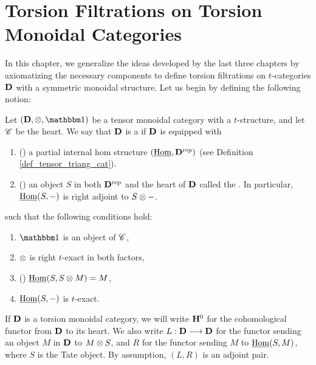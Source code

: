\newpage
\chapter{Torsion Filtrations on Torsion Monoidal Categories}
\label{sect_filtration_general}

In this chapter, we generalize the ideas developed by the last
three chapters by axiomatizing the necessary components to define
torsion filtrations on $t$-categories $\mathbf{D}$ with a symmetric
monoidal structure. Let us begin by defining the following notion:

\begin{defn}\label{def_torsion_monoidal_category}
Let $(\DCat, \tensor, \Unit)$ be a tensor monoidal category with 
a $t$-structure, and let $\mathscr{C}$ be the heart. We say that 
$\mathbf{D}$ is a  if $\mathbf{D}$ is 
equipped with 
\begin{enumerate}
\item () a partial internal hom
structure $(\underline{\mathrm{Hom}}, \mathbf{D}^{\mathrm{rep}})$ (see Definition
\ref{def_tensor_triang_cat}).

\item () an object $S$ in both 
   $\mathbf{D}^{\mathrm{rep}}$ and the heart of $\mathbf{D}$ called the 
   . In particular, $\underline{\mathrm{Hom}}(S, -)$ is right
   adjoint to $S \otimes -$.
\end{enumerate}

\noindent such that the following conditions hold:

\begin{enumerate}
\item $\Unit$ is an object of $\mathscr{C}$,

\item $\otimes$ is right $t$-exact in both factors,

\item () $\underline{\mathrm{Hom}}(S, S \otimes M) = M$,

\item $\underline{\mathrm{Hom}}(S, -)$ is $t$-exact.
\end{enumerate}
\end{defn}

If $\mathbf{D}$ is a torsion monoidal category, we will write $\mathbf{H}^0$
for the cohomological functor from $\mathbf{D}$ to its heart. We also 
write $L: \mathbf{D} \longrightarrow \mathbf{D}$ for the functor sending an object $M$ 
in $\mathbf{D}$ to $M \otimes S$, and $R$ for the functor sending $M$
to $\underline{\mathrm{Hom}}(S, M)$, where $S$ is the Tate object. By assumption,
$(L, R)$ is an adjoint pair.

